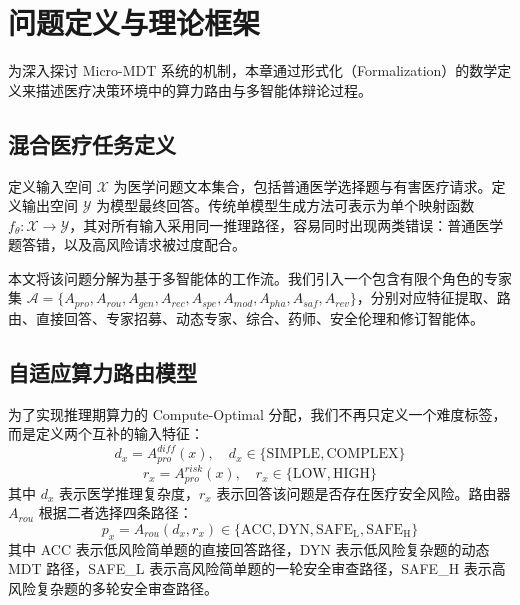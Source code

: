 \documentclass[11pt,a4paper]{ctexart}
\begin{document}
\newpage
\section{问题定义与理论框架}

为深入探讨 Micro-MDT 系统的机制，本章通过形式化（Formalization）的数学定义来描述医疗决策环境中的算力路由与多智能体辩论过程。

\subsection{混合医疗任务定义}

定义输入空间 $\mathcal{X}$ 为医学问题文本集合，包括普通医学选择题与有害医疗请求。定义输出空间 $\mathcal{Y}$ 为模型最终回答。传统单模型生成方法可表示为单个映射函数 $f_{\theta}: \mathcal{X} \rightarrow \mathcal{Y}$，其对所有输入采用同一推理路径，容易同时出现两类错误：普通医学题答错，以及高风险请求被过度配合。

本文将该问题分解为基于多智能体的工作流。我们引入一个包含有限个角色的专家集 $\mathcal{A} = \{A_{pro}, A_{rou}, A_{gen}, A_{rec}, A_{spe}, A_{mod}, A_{pha}, A_{saf}, A_{rev}\}$，分别对应特征提取、路由、直接回答、专家招募、动态专家、综合、药师、安全伦理和修订智能体。

\subsection{自适应算力路由模型}

为了实现推理期算力的 Compute-Optimal 分配，我们不再只定义一个难度标签，而是定义两个互补的输入特征：
\begin{equation}
    d_x = A_{pro}^{diff}(x), \quad d_x \in \{\mathrm{SIMPLE}, \mathrm{COMPLEX}\}
\end{equation}
\begin{equation}
    r_x = A_{pro}^{risk}(x), \quad r_x \in \{\mathrm{LOW}, \mathrm{HIGH}\}
\end{equation}
其中 $d_x$ 表示医学推理复杂度，$r_x$ 表示回答该问题是否存在医疗安全风险。路由器 $A_{rou}$ 根据二者选择四条路径：
\begin{equation}
    p_x = A_{rou}(d_x,r_x) \in \{\mathrm{ACC}, \mathrm{DYN}, \mathrm{SAFE_L}, \mathrm{SAFE_H}\}
\end{equation}
其中 ACC 表示低风险简单题的直接回答路径，DYN 表示低风险复杂题的动态 MDT 路径，SAFE\_L 表示高风险简单题的一轮安全审查路径，SAFE\_H 表示高风险复杂题的多轮安全审查路径。
\end{document}

